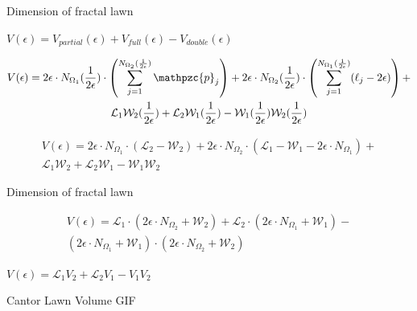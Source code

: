 \documentclass{if-beamer}
\newcommand{\SL}{\mathcal{L}}
\newcommand{\W}{\mathcal{W}}
\newcommand{\p}{\mathpzc{p}}
\begin{document}
\begin{frame}{Dimension of fractal lawn}

	
	$V(\epsilon)=V_{partial}(\epsilon) + V_{full}(\epsilon) - V_{double}(\epsilon)$
	
	\begin{multline*}
	V(\epsilon)=2\epsilon \cdot N_{\Omega_1}(\frac{1}{2\epsilon}) \cdot \left(\sum_{j=1}^{N_{\Omega_2}(\frac{1}{2\epsilon})} \p_j \right) + 2\epsilon \cdot N_{\Omega_2}(\frac{1}{2\epsilon}) \cdot \left(\sum_{j=1}^{N_{\Omega_1}(\frac{1}{2\epsilon})} (\ell_j - 2\epsilon) \right) + \\
	 \SL_1 \W_2(\frac{1}{2\epsilon}) + \SL_2 \W_1(\frac{1}{2\epsilon}) - \W_1(\frac{1}{2\epsilon}) \W_2(\frac{1}{2\epsilon})
	\end{multline*}
	
	\begin{multline*}
	V(\epsilon) = 2\epsilon \cdot N_{\Omega_1} \cdot (\SL_2 - \W_2) + 2\epsilon \cdot N_{\Omega_2} \cdot \left( \SL_1 - \W_1 - 2\epsilon \cdot N_{\Omega_1} \right) + \\
	 \SL_1 \W_2 + \SL_2 \W_1 - \W_1 \W_2
	\end{multline*}
	
\end{frame}

\begin{frame}{Dimension of fractal lawn}
	
	\begin{multline*}
	V(\epsilon) = \SL_1 \cdot (2\epsilon \cdot N_{\Omega_2} + \W_2) + \SL_2 \cdot (2\epsilon \cdot N_{\Omega_1} + \W_1) - \\
	(2\epsilon \cdot N_{\Omega_1} + \W_1) \cdot (2\epsilon \cdot N_{\Omega_2} + \W_2)
	\end{multline*}
	
	$V(\epsilon) = \SL_1 V_2 + \SL_2 V_1 - V_1 V_2$
	
\end{frame}


\begin{frame}{Cantor Lawn Volume GIF}
	\begin{center}
	\end{center}
\end{frame}
\end{document}
